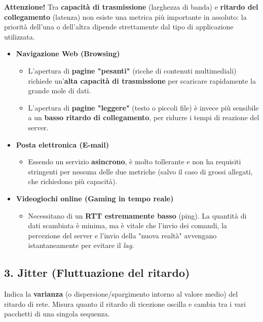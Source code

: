 \documentclass[a4paper,12pt]{report}
\begin{document}
\begin{notebox}{\textbf{Attenzione!}}
Tra \textbf{capacità di trasmissione} (larghezza di banda) e \textbf{ritardo del collegamento} (latenza) non esiste una metrica più importante in assoluto: la priorità dell'una o dell'altra dipende strettamente dal tipo di applicazione utilizzata.

\begin{itemize}
    \item \textbf{Navigazione Web (Browsing)}
    \begin{itemize}
        \item L'apertura di \textbf{pagine "pesanti"} (ricche di contenuti multimediali) richiede un'\textbf{alta capacità di trasmissione} per scaricare rapidamente la grande mole di dati.
        \item L'apertura di \textbf{pagine "leggere"} (testo o piccoli file) è invece più sensibile a un \textbf{basso ritardo di collegamento}, per ridurre i tempi di reazione del server.
    \end{itemize}
    
    \item \textbf{Posta elettronica (E-mail)}
    \begin{itemize}
        \item Essendo un servizio \textbf{asincrono}, è molto tollerante e non ha requisiti stringenti per nessuna delle due metriche (salvo il caso di grossi allegati, che richiedono più capacità).
    \end{itemize}
    
    \item \textbf{Videogiochi online (Gaming in tempo reale)}
    \begin{itemize}
        \item Necessitano di un \textbf{RTT estremamente basso} (ping). La quantità di dati scambiata è minima, ma è vitale che l'invio dei comandi, la percezione del server e l'invio della "nuova realtà" avvengano istantaneamente per evitare il \textit{lag}.
    \end{itemize}
\end{itemize}
\end{notebox}



\newpage
\subsection*{3. Jitter (Fluttuazione del ritardo)}
\begin{defbox}{}
Indica la \textbf{varianza} (o dispersione/spargimento intorno al valore medio) del ritardo di rete. Misura quanto il ritardo di ricezione oscilla e cambia tra i vari pacchetti di una singola sequenza.
\end{defbox}
\end{document}
